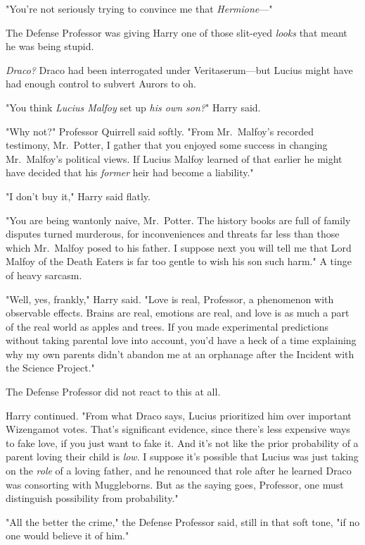 "You're not seriously trying to convince me that \emph{Hermione}—"

The Defense Professor was giving Harry one of those slit-eyed \emph{looks} that
meant he was being stupid.

\emph{Draco?} Draco had been interrogated under Veritaserum—but Lucius might
have had enough control to subvert Aurors to{\el} oh.

"You think \emph{Lucius Malfoy} set up \emph{his own son?}" Harry said.

"Why not?" Professor Quirrell said softly. "From Mr.~Malfoy's recorded
testimony, Mr.~Potter, I gather that you enjoyed some success in changing
Mr.~Malfoy's political views. If Lucius Malfoy learned of that earlier{\el}
he might have decided that his \emph{former} heir had become a liability."

"I don't buy it," Harry said flatly.

"You are being wantonly naive, Mr.~Potter. The history books are full of family
disputes turned murderous, for inconveniences and threats far less than those
which Mr.~Malfoy posed to his father. I suppose next you will tell me that Lord
Malfoy of the Death Eaters is far too gentle to wish his son such harm." A
tinge of heavy sarcasm.

"Well, yes, frankly," Harry said. "Love is real, Professor, a phenomenon with
observable effects. Brains are real, emotions are real, and love is as much a
part of the real world as apples and trees. If you made experimental
predictions without taking parental love into account, you'd have a heck of a
time explaining why my own parents didn't abandon me at an orphanage after the
Incident with the Science Project."

The Defense Professor did not react to this at all.

Harry continued. "From what Draco says, Lucius prioritized him over important
Wizengamot votes. That's significant evidence, since there's less expensive
ways to fake love, if you just want to fake it. And it's not like the prior
probability of a parent loving their child is \emph{low}. I suppose it's
possible that Lucius was just taking on the \emph{role} of a loving father, and
he renounced that role after he learned Draco was consorting with Muggleborns.
But as the saying goes, Professor, one must distinguish possibility from
probability."

"All the better the crime," the Defense Professor said, still in that soft
tone, "if no one would believe it of him."

